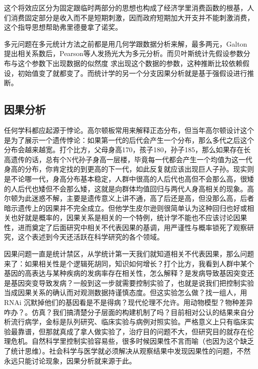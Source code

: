 \documentclass[]{tufte-book}
\begin{document}
这个将效应区分为固定跟临时两部分的思想也构成了经济学里消费函数的根基，人们消费固定部分是收入而不是短期刺激，因而政府短期加大开支并不能刺激消费，这个指导思想帮助弗里德曼拿了诺奖。

多元问题在多元统计方法之前都是用几何学跟数据分析来解，最多两元，Galton提出相关系数后，Pearson等人发扬光大为多元分析。而贝叶斯统计先假设参数分布与这个参数下出现数据的似然度 求出现这个数据的参数，这种推断比较依赖假设，初始值变了就都变了。而统计学的另一个分支因果分析就是基于强假设进行推断。

\hypertarget{ux56e0ux679cux5206ux6790}{%
\subsection{因果分析}\label{ux56e0ux679cux5206ux6790}}

任何学科都应起源于悖论。高尔顿板常用来解释正态分布，但当年高尔顿设计这个是为了展示一个遗传悖论：如果第一代的后代会产生一个分布，那么多代之后这个分布会越来越宽。打个比方，父母身高170，孩子180，孙子185，那么如果存在长高遗传的话，总有个N代孙子身高一层楼，毕竟每一代都会产生一个均值为这一代身高的分布，你肯定找的到更高的下一代，如此反复就应该出现巨人子孙。现实则是不论哪一代，身高分布基本稳定，人群中很高的人后代也高但不会那么高，很矮的人后代也矮但不会那么矮，这就是向群体均值回归与两代人身高相关的现象。高尔顿为此迷惑不解，主要是遗传意义上讲不通，高了后还是高，但没那么高，后者暗示遗传上的因果并不完全成立。但他学生皮尔逊则很简单认为这种回归也好或相关也好就是概率的，因果关系是相关的一个特例，统计学不能也不应该讨论因果性，进而奠定了后面研究中相关不代表因果的基调，用严谨性与概率锁死了观察研究，这个表述到今天还活跃在科学研究的各个领域。

因果问题一直是统计禁区，从学统计第一天我们就知道相关不代表因果，那么问题来了：如果相关性是个逻辑死胡同，知识如何增长？打个比方，我看到人群中某个基因的高表达与某种疾病的发病率存在相关性，怎么解释？是发病导致基因突变还是基因突变导致发病？一般到这一步就需要控制实验了，也就是说我们把控制实验当成因果关系的确认而对观测数据持谨慎态度。但这实验怎么做？找一组人，用 RNAi 沉默掉他们的基因看是不是得病？现代伦理不允许。用动物模型？物种差异咋办？。仿真？我们搞清楚分子层面的构建机制了吗？目前相对公认的结果来自分析流行病学，金标是队列研究、临床实验与病例对照实验。严格意义上只有临床实验最靠谱，但那就真成了拿人做实验了，治疗目的问题不大，但研究目的就存在伦理危机。自然科学里控制实验容易些，很多时候因果性不言而喻（也因为这个缺乏了统计思维）。社会科学与医学就必须解决从观察结果中发现因果性的问题，不然永远只能讨论现象，因果分析就来源于此。
\end{document}
